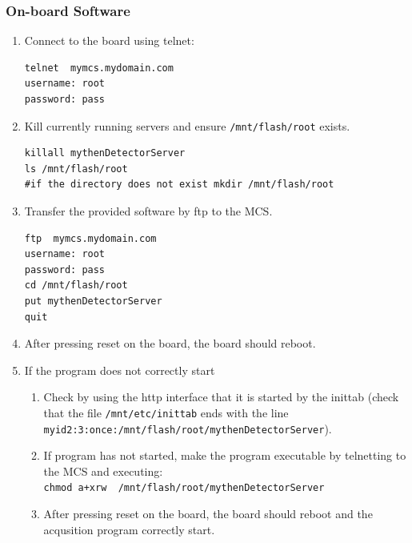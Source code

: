 \documentclass{article}
\begin{document}
\subsubsection{On-board Software}
\begin{enumerate}
 \item Connect to the board using telnet:
\begin{verbatim}
telnet  mymcs.mydomain.com
username: root
password: pass
\end{verbatim}
 \item Kill currently running servers and ensure \verb=/mnt/flash/root= exists.
\begin{verbatim}
killall mythenDetectorServer
ls /mnt/flash/root
#if the directory does not exist mkdir /mnt/flash/root
\end{verbatim}
 \item Transfer the provided software by ftp to the MCS.
\begin{verbatim}
ftp  mymcs.mydomain.com
username: root
password: pass
cd /mnt/flash/root
put mythenDetectorServer
quit
\end{verbatim}

\item After pressing reset on the board, the board should reboot.

\item If the program does not correctly start
 \begin{enumerate}
  \item Check by using the http interface that it is started by the inittab
(check that the file \verb=/mnt/etc/inittab= ends with the line \\
\verb=myid2:3:once:/mnt/flash/root/mythenDetectorServer=).  
  \item If program has not started, make the program executable by telnetting to
the MCS and executing: \\
\verb=chmod a+xrw  /mnt/flash/root/mythenDetectorServer=
  \item After pressing reset on the board, the board should reboot and the
acqusition program correctly start.
 \end{enumerate}
\end{enumerate}
\end{document}
